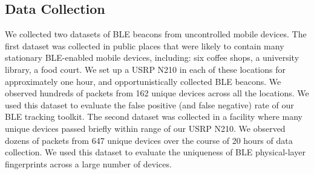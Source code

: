 \subsection*{Data Collection}

We collected two datasets of BLE beacons from uncontrolled mobile devices.
%
The first dataset was collected in public places that were likely to contain
many stationary BLE-enabled mobile devices, including: six coffee shops, a
university library, a food court. 
%
We set up a USRP N210 in each of these locations for approximately one hour,
and opportunistically collected BLE beacons. We observed hundreds of packets
from 162 unique devices across all the locations.
%
We used this dataset to evaluate the false positive (and false negative) rate of our BLE tracking toolkit.
%
The second dataset was collected in a facility where many unique devices passed 
briefly within range of our USRP N210. We observed dozens of packets from 647
unique devices over the course of 20 hours of data collection.
%
We used this dataset to evaluate the uniqueness of BLE physical-layer
fingerprints across a large number of devices.

%

